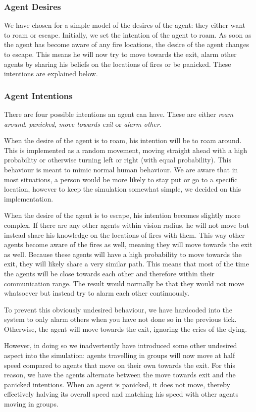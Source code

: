 \documentclass[a4paper]{article}
\begin{document}
\subsubsection{Agent Desires}
We have chosen for a simple model of the desires of the agent: they either want to roam or escape. Initially, we set the intention of the agent to roam. As soon as the agent has become aware of any fire locations, the desire of the agent changes to escape. This means he will now try to move towards the exit, alarm other agents by sharing his beliefs on the locations of fires or be panicked. These intentions are explained below.

\subsubsection{Agent Intentions}
There are four possible intentions an agent can have. These are either \textit{roam around}, \textit{panicked}, \textit{move towards exit} or \textit{alarm other}. 

When the desire of the agent is to roam, his intention will be to roam around. This is implemented as a random movement, moving straight ahead with a high probability or otherwise turning left or right (with equal probability). This behaviour is meant to mimic normal human behaviour. We are aware that in most situations, a person would be more likely to stay put or go to a specific location, however to keep the simulation somewhat simple, we decided on this implementation.

When the desire of the agent is to escape, his intention becomes slightly more complex. If there are any other agents within vision radius, he will not move but instead share his knowledge on the locations of fires with them. This way other agents become aware of the fires as well, meaning they will move towards the exit as well. Because these agents will have a high probability to move towards the exit, they will likely share a very similar path. This means that most of the time the agents will be close towards each other and therefore within their communication range. The result would normally be that they would not move whatsoever but instead try to alarm each other continuously. 

To prevent this obviously undesired behaviour, we have hardcoded into the system to only alarm others when you have not done so in the previous tick. Otherwise, the agent will move towards the exit, ignoring the cries of the dying.

However, in doing so we inadvertently have introduced some other undesired aspect into the simulation: agents travelling in groups will now move at half speed compared to agents that move on their own towards the exit. For this reason, we have the agents alternate between the move towards exit and the panicked intentions. When an agent is panicked, it does not move, thereby effectively halving its overall speed and matching his speed with other agents moving in groups.
\end{document}
